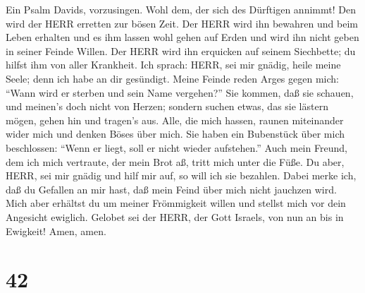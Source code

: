  Ein Psalm Davids, vorzusingen. Wohl dem, der sich des
Dürftigen annimmt! Den wird der HERR erretten zur bösen Zeit.
 Der HERR wird ihn bewahren und beim Leben erhalten und es
ihm lassen wohl gehen auf Erden und wird ihn nicht geben in seiner
Feinde Willen.  Der HERR wird ihn erquicken auf seinem
Siechbette; du hilfst ihm von aller Krankheit.  Ich sprach:
HERR, sei mir gnädig, heile meine Seele; denn ich habe an dir gesündigt.
 Meine Feinde reden Arges gegen mich: ``Wann wird er sterben
und sein Name vergehen?''  Sie kommen, daß sie schauen, und
meinen's doch nicht von Herzen; sondern suchen etwas, das sie lästern
mögen, gehen hin und tragen's aus.  Alle, die mich hassen,
raunen miteinander wider mich und denken Böses über mich. 
Sie haben ein Bubenstück über mich beschlossen: ``Wenn er liegt, soll er
nicht wieder aufstehen.''  Auch mein Freund, dem ich mich
vertraute, der mein Brot aß, tritt mich unter die Füße.  Du
aber, HERR, sei mir gnädig und hilf mir auf, so will ich sie bezahlen.
 Dabei merke ich, daß du Gefallen an mir hast, daß mein
Feind über mich nicht jauchzen wird.  Mich aber erhältst du
um meiner Frömmigkeit willen und stellst mich vor dein Angesicht
ewiglich.  Gelobet sei der HERR, der Gott Israels, von nun
an bis in Ewigkeit! Amen, amen.

\hypertarget{section-41}{%
\section{42}\label{section-41}}


